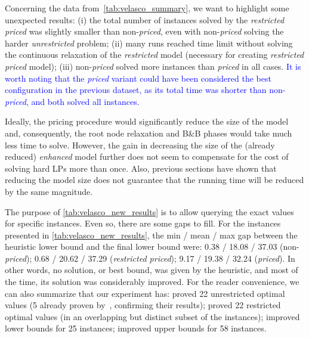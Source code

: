 \documentclass[smallextended]{svjour3}       %
\newif\iffinalversion
\newcommand{\newtext}[1]{\iffinalversion%
#1%
\else%
\textcolor{blue}{#1}%
\fi%
}
\begin{document}
Concerning the data from~\autoref{tab:velasco_summary}, we want to highlight some unexpected results:
(i) the total number of instances solved by the \emph{restricted priced} was slightly smaller than non-\emph{priced}, even with non-\emph{priced} solving the harder \emph{unrestricted} problem;
(ii) many runs reached time limit without solving the continuous relaxation of the \emph{restricted} model (necessary for creating \emph{restricted priced} model);
(iii) non-\emph{priced} solved more instances than \emph{priced} in all cases.
\newtext{It is worth noting that the \emph{priced} variant could have been considered the best configuration in the previous dataset, as its total time was shorter than non-\emph{priced}, and both solved all instances.}
Ideally, the pricing procedure would significantly reduce the size of the model and, consequently, the root node relaxation and B\&B phases would take much less time to solve.
However, the gain in decreasing the size of the (already reduced) \emph{enhanced} model further does not seem to compensate for the cost of solving hard LPs more than once.
Also, previous sections have shown that reducing the model size does not guarantee that the running time will be reduced by the same magnitude.

The purpose of \autoref{tab:velasco_new_results} is to allow querying the exact values for specific instances.
Even so, there are some gaps to fill.
For the instances presented in \autoref{tab:velasco_new_results},
the min / mean / max gap between the heuristic lower bound and the final lower bound were: 0.38 / 18.08 / 37.03 (non-\emph{priced}); 0.68 / 20.62 / 37.29 (\emph{restricted priced}); 9.17 / 19.38 / 32.24 (\emph{priced}).
In other words, no solution, or best bound, was given by the heuristic, and most of the time, its solution was considerably improved.
For the reader convenience, we can also summarize that our experiment has:
proved 22 unrestricted optimal values (5 already proven by~\cite{velasco:2019}, confirming their results);
proved 22 restricted optimal values (in an overlapping but distinct subset of the instances);
improved lower bounds for 25 instances;
improved upper bounds for 58 instances.
\end{document}
